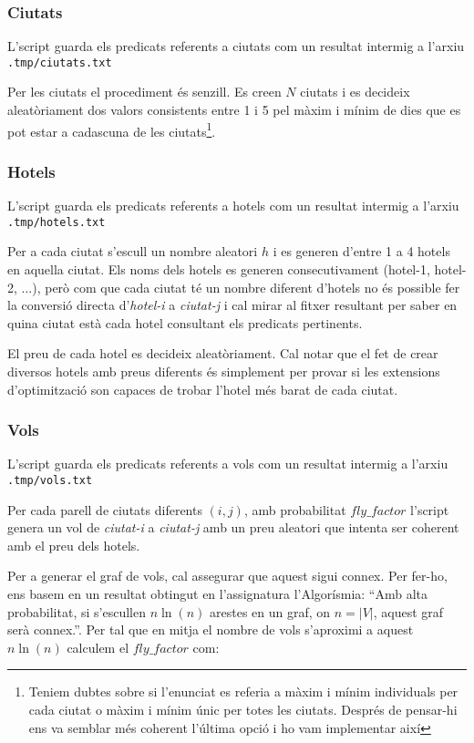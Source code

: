 \documentclass[11pt,a4paper]{article}
\begin{document}
\subsubsection*{Ciutats}

L'script guarda els predicats referents a ciutats com un resultat intermig a l'arxiu \texttt{.tmp/ciutats.txt}

Per les ciutats el procediment és senzill. Es creen $N$ ciutats i es decideix aleatòriament dos valors consistents entre 1 i 5 pel màxim i mínim de dies que es pot estar a cadascuna de les ciutats\footnote{Teniem dubtes sobre si l'enunciat es referia a màxim i mínim individuals per cada ciutat o màxim i mínim únic per totes les ciutats. Després de pensar-hi ens va semblar més coherent l'última opció i ho vam implementar així}.

\subsubsection*{Hotels}

L'script guarda els predicats referents a hotels com un resultat intermig a l'arxiu \texttt{.tmp/hotels.txt}

Per a cada ciutat s'escull un nombre aleatori $h$ i es generen d'entre 1 a 4 hotels en aquella ciutat. Els noms dels hotels es generen consecutivament (hotel-1, hotel-2, ...), però com que cada ciutat té un nombre diferent d'hotels no és possible fer la conversió directa d'\emph{hotel-i} a \emph{ciutat-j} i cal mirar al fitxer resultant per saber en quina ciutat està cada hotel consultant els predicats pertinents.

El preu de cada hotel es decideix aleatòriament. Cal notar que el fet de crear diversos hotels amb preus diferents és simplement per provar si les extensions d'optimització son capaces de trobar l'hotel més barat de cada ciutat.

\subsubsection*{Vols}

L'script guarda els predicats referents a vols com un resultat intermig a l'arxiu \texttt{.tmp/vols.txt}

Per cada parell de ciutats diferents $(i,j)$, amb probabilitat $fly\_factor$ l'script genera un vol de \emph{ciutat-i} a \emph{ciutat-j} amb un preu aleatori que intenta ser coherent amb el preu dels hotels. 

Per a generar el graf de vols, cal assegurar que aquest sigui connex. Per fer-ho, ens basem en un resultat obtingut en l'assignatura l'Algorísmia: ``Amb alta probabilitat, si s'escullen $n \ln(n)$ arestes en un graf, on $n=|V|$, aquest graf serà connex.''. Per tal que en mitja el nombre de vols s'aproximi a aquest $n \ln(n)$ calculem el $fly\_factor$ com:
\end{document}
